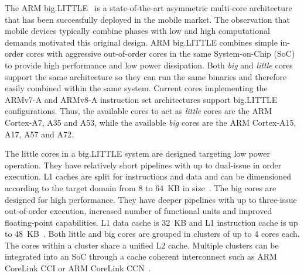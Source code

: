 
The ARM big.LITTLE~\cite{samsung, Greenhalgh2011} is a state-of-the-art asymmetric multi-core architecture that has been successfully deployed in the mobile market. The observation that mobile devices typically combine phases with low and high computational demands motivated this original design. ARM big.LITTLE combines simple in-order cores with aggressive out-of-order cores in the same System-on-Chip (SoC) to provide high performance and low power dissipation. Both \textit{big} and \textit{little} cores support the same architecture so they can run the same binaries and therefore easily combined within the same system.
% 
Current cores implementing the ARMv7-A and ARMv8-A instruction set architectures support big.LITTLE configurations. Thus, the available cores to act as \textit{little} cores are the ARM Cortex-A7, A35 and A53, while the available \textit{big} cores are the ARM Cortex-A15, A17, A57 and A72.

The little cores in a big.LITTLE system are designed targeting low power operation. They have relatively short pipelines with up to dual-issue in order execution. L1 caches are split for instructions and data and can be dimensioned according to the target domain from 8 to 64~KB in size~\cite{MPR_A53}. The big cores are designed for high performance. They have deeper pipelines with up to three-issue out-of-order execution, increased number of functional units and improved floating-point capabilities. L1 data cache is 32~KB and L1 instruction cache is up to 48~KB~\cite{MPR_A57, MPR_A72}. Both little and big cores are grouped in clusters of up to 4 cores each. The cores within a cluster share a unified L2 cache. Multiple clusters can be integrated into an SoC through a cache coherent interconnect such as ARM CoreLink CCI or ARM CoreLink CCN~\cite{CCI}.

